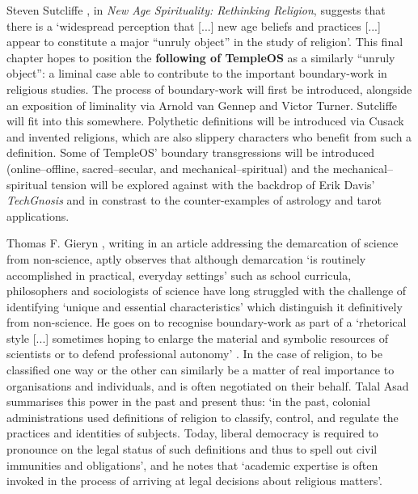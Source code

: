



Steven Sutcliffe \parencite*{Sutcliffe14},
in \textit{New Age Spirituality: Rethinking Religion},
suggests that there is a `widespread perception that [...]
new age beliefs and practices [...] appear to constitute
a major ``unruly object'' in the study of religion'.
This final chapter hopes to position the \textbf{following of TempleOS} as a
similarly ``unruly object'': a liminal case able to contribute to the
important boundary-work in religious studies.
The process of boundary-work will first be introduced,
alongside an exposition of liminality via Arnold van Gennep and Victor Turner.
Sutcliffe will fit into this somewhere.
Polythetic definitions will be introduced via Cusack and invented religions,
which are also slippery characters who benefit from such a definition.
Some of TempleOS' boundary transgressions will be introduced
(online--offline, sacred--secular, and mechanical--spiritual)
and the mechanical--spiritual tension will be explored
against with the backdrop of Erik Davis' \textit{TechGnosis}
and in constrast to the counter-examples of astrology and tarot applications.

Thomas F. Gieryn \parencite*[781]{Gieryn83}, writing in an article
addressing the demarcation of science from non-science, aptly observes
that although demarcation `is routinely accomplished in practical,
everyday settings' such as school curricula,
philosophers and sociologists of science have long struggled
with the challenge of identifying `unique and essential characteristics'
which distinguish it definitively from non-science.
He goes on to recognise boundary-work as part of a `rhetorical style [...]
sometimes hoping to enlarge the material and symbolic resources of scientists
or to defend professional autonomy' \parencite[782]{Gieryn83}.
In the case of religion, to be classified one way or the other can similarly
be a matter of real importance to organisations and individuals,
and is often negotiated on their behalf.
Talal Asad \parencite*[39]{Asad11} summarises this power
in the past and present thus:
`in the past, colonial  administrations  used definitions of religion
to classify, control, and regulate the practices and identities of subjects.
Today, liberal democracy  is required to pronounce on the legal status
of such definitions and thus to spell out civil immunities and obligations',
and he notes that `academic expertise is often invoked
in the process of arriving at legal decisions about religious matters'.

